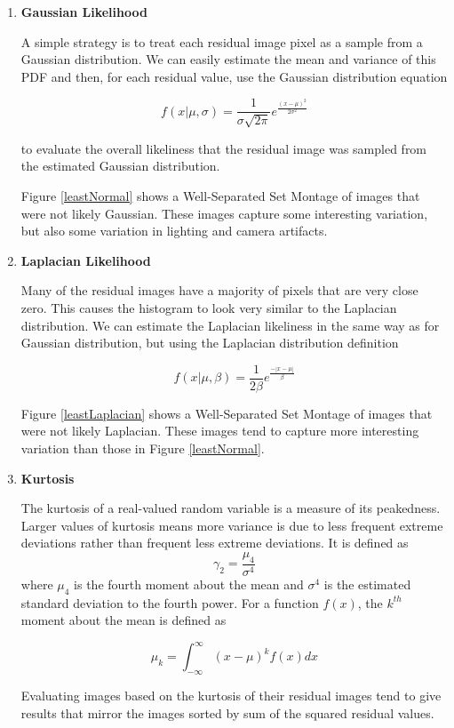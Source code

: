 \begin{enumerate}
\item{\textbf{Gaussian Likelihood}}

A simple strategy is to treat each residual image pixel as a sample from a Gaussian distribution.  We can easily estimate the mean and variance of this PDF and then, for each residual value, use the Gaussian distribution equation 

$$f(x|\mu,\sigma)=\frac{1}{\sigma\sqrt{2\pi}}e^{\frac{(x-\mu)^2}{2\sigma^2}}$$

to evaluate the overall likeliness that the residual image was sampled from the estimated Gaussian distribution.  

Figure \ref{leastNormal} shows a Well-Separated Set Montage of images that were not likely Gaussian.  These images capture some interesting variation, but also some variation in lighting and camera artifacts.

\item{\textbf{Laplacian Likelihood}}

Many of the residual images have a majority of pixels that are very close zero.  This causes the histogram to look very similar to the Laplacian distribution.  We can estimate the Laplacian likeliness in the same way as for Gaussian distribution, but using the Laplacian distribution definition

$$f(x|\mu,\beta)=\frac{1}{2\beta}e^{\frac{-|x-\mu|}{\beta}}$$

Figure \ref{leastLaplacian} shows a Well-Separated Set Montage of images that were not likely Laplacian.  These images tend to capture more interesting variation than those in Figure \ref{leastNormal}.

\item{\textbf{Kurtosis}}

The kurtosis of a real-valued random variable is a measure of its peakedness.  Larger values of kurtosis means more variance is due to less frequent extreme deviations rather than frequent less extreme deviations.  It is defined as $$\gamma_2=\frac{\mu_4}{\sigma^4}$$ where $\mu_4$ is the fourth moment about the mean and $\sigma^4$ is the estimated standard deviation to the fourth power.  For a function $f(x)$, the $k^{th}$ moment about the mean is defined as 

$$\mu_k = \int_{-\infty}^{\infty}{(x-\mu)^kf(x)dx}$$

Evaluating images based on the kurtosis of their residual images tend to give results that mirror the images sorted by sum of the squared residual values.   


\end{enumerate}
